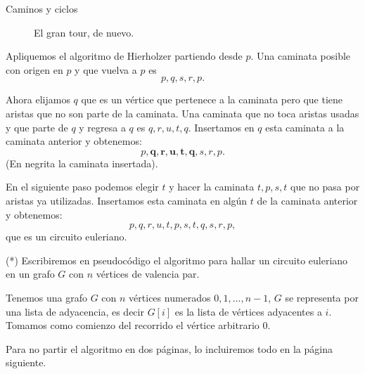 \begin{section}{Caminos y ciclos}
\begin{ejemplo*}
\begin{figure}[ht]
    \begin{center}
    \end{center}
    \caption{El gran tour, de nuevo.} \label{f5.7.1}
\end{figure}

Apliquemos el algoritmo de Hierholzer partiendo  desde $p$. Una caminata posible con origen en $p$ y que vuelva a $p$ es $$p, q, s, r, p.$$

Ahora elijamos $q$ que es un vértice que pertenece a la caminata pero que tiene aristas que no son parte de la caminata. Una caminata que no toca aristas usadas y  que parte de $q$ y regresa a $q$ es $q,r,u,t,q$. Insertamos en $q$  esta caminata  a la caminata anterior y obtenemos:
$$
p,\mathbf{q,r,u,t,q,} s, r, p. 
$$
(En  negrita la caminata insertada).

En  el siguiente paso podemos  elegir $t$ y hacer la caminata $t, p, s, t$ que no pasa por aristas ya utilizadas. Insertamos esta caminata en algún $t$ de la caminata anterior y obtenemos:
$$
p,q,r,u,t, p, s, t,q, s, r, p,
$$
que es un circuito euleriano. 
\end{ejemplo*}



\begin{observacion*}(*) Escribiremos en pseudocódigo el algoritmo para hallar un circuito euleriano en un grafo $G$ con $n$ vértices  de valencia par.
    
Tenemos una grafo $G$ con  $n$ vértices numerados $0,1,\ldots,n-1$,  $G$ se representa por  una lista de adyacencia, es decir $G[i]$  es la lista de vértices adyacentes a $i$.  Tomamos como comienzo del recorrido el vértice arbitrario $0$.

Para no partir el algoritmo en dos páginas, lo incluiremos todo en la página siguiente. 


\end{observacion*}
\end{section}
